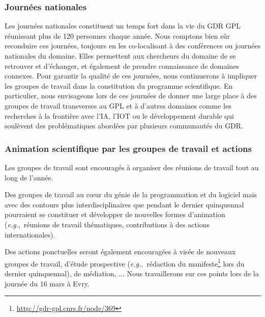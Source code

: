 \documentclass[11pt]{article}
\newcommand{\eg}[0]{\emph{e.g.},~}
\begin{document}
\subsubsection{Journées nationales}

Les journées nationales constituent un temps fort dans la vie du
GDR GPL réunissant plus de 120 personnes chaque année. Nous comptons bien sûr reconduire ces journées, toujours en les co-localisant à des conférences ou journées nationales du domaine.
Elles permettent aux chercheurs du domaine de se retrouver et d'échanger, et
également de prendre connaissance de domaines connexes. 
Pour garantir la qualité de ces journées, nous continuerons à impliquer les groupes de travail dans la constitution du programme scientifique. En particulier, nous envisageons lors de ces journées de donner une large place à des groupes de travail transverses au GPL et à d'autres domaines comme les recherches à la frontière avec l'IA, l'IOT ou le développement durable qui soulèvent des problématiques abordées par plusieurs communautés du GDR. 



\subsubsection{Animation scientifique par les groupes de travail et actions}

Les groupes de travail sont encouragés à organiser des réunions de travail
tout au long de l'année. 

Des groupes de travail au c\oe{}ur du génie de la programmation et du logiciel mais avec des contours plus interdisciplinaires que pendant le dernier quinquennal pourraient se constituer et développer de nouvelles formes d'animation (\eg réunions de travail thématiques, contributions à des actions internationales). 

Des actions ponctuelles seront également encouragées à visée de nouveaux groupes de travail, d'étude prospective (\eg rédaction du manifeste\footnote{\url{http://gdr-gpl.cnrs.fr/node/369}} lors du dernier quinquennal), de médiation, ... 
Nous travaillerons sur ces points lors de la journée du 16 mars à Evry. 
\end{document}
